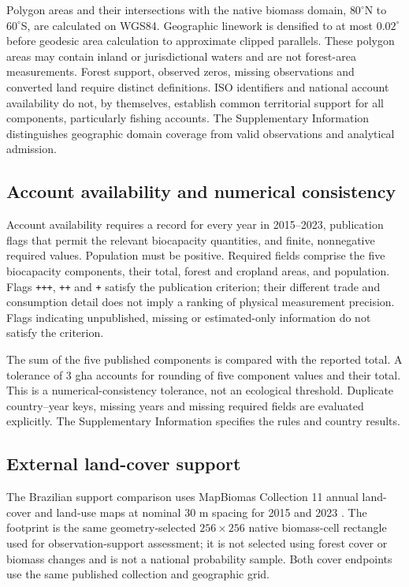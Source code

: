 \documentclass[11pt,a4paper]{article}
\begin{document}
Polygon areas and their intersections with the native biomass domain, $80^\circ$N to $60^\circ$S, are calculated on WGS84. Geographic linework is densified to at most $0.02^\circ$ before geodesic area calculation to approximate clipped parallels. These polygon areas may contain inland or jurisdictional waters and are not forest-area measurements. Forest support, observed zeros, missing observations and converted land require distinct definitions. ISO identifiers and national account availability do not, by themselves, establish common territorial support for all components, particularly fishing accounts. The Supplementary Information distinguishes geographic domain coverage from valid observations and analytical admission.

\subsection{Account availability and numerical consistency}
Account availability requires a record for every year in 2015--2023, publication flags that permit the relevant biocapacity quantities, and finite, nonnegative required values. Population must be positive. Required fields comprise the five biocapacity components, their total, forest and cropland areas, and population. Flags \texttt{+++}, \texttt{++} and \texttt{+} satisfy the publication criterion; their different trade and consumption detail does not imply a ranking of physical measurement precision. Flags indicating unpublished, missing or estimated-only information do not satisfy the criterion.

The sum of the five published components is compared with the reported total. A tolerance of 3 gha accounts for rounding of five component values and their total. This is a numerical-consistency tolerance, not an ecological threshold. Duplicate country--year keys, missing years and missing required fields are evaluated explicitly. The Supplementary Information specifies the rules and country results.

\subsection{External land-cover support}
The Brazilian support comparison uses MapBiomas Collection 11 annual land-cover and land-use maps at nominal 30 m spacing for 2015 and 2023 \citep{MapBiomas2026}. The footprint is the same geometry-selected $256\times256$ native biomass-cell rectangle used for observation-support assessment; it is not selected using forest cover or biomass changes and is not a national probability sample. Both cover endpoints use the same published collection and geographic grid.
\end{document}
